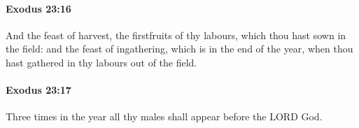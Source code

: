 		\paragraph{Exodus 23:16} %
			\label{EXODUS-23-16}

			And the feast of harvest, the firstfruits of thy labours, which thou hast sown in the field: and the feast of ingathering, which is in the end of the year, when thou hast gathered in thy labours out of the field.


		\paragraph{Exodus 23:17} %
			\label{EXODUS-23-17}

			Three times in the year all thy males shall appear before the LORD God.


